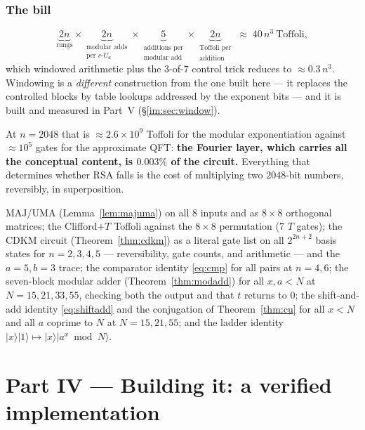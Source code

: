 \documentclass[11pt]{article}
\renewcommand{\ket}[1]{\lvert #1 \rangle}
\newcommand{\MAJ}{\mathrm{MAJ}}
\newcommand{\UMA}{\mathrm{UMA}}
\theoremstyle{plain}
\theoremstyle{remark}
\begin{document}
\section{The bill}

\[
\underbrace{2n}_{\text{rungs}}\times\underbrace{2n}_{\substack{\text{modular adds}\\ \text{per }c\text{-}U_a}}
\times\underbrace{5}_{\substack{\text{additions per}\\ \text{modular add}}}\times\underbrace{2n}_{\substack{\text{Toffoli per}\\ \text{addition}}}
\;\approx\;40\,n^3\ \text{Toffoli},
\]
which windowed arithmetic \cite{gidney-window} plus the $3$-of-$7$ control trick reduces to
$\approx0.3\,n^3$. Windowing is a \emph{different} construction from the one built here --- it
replaces the controlled blocks by table lookups addressed by the exponent bits --- and it is built
and measured in Part~V (\S\ref{im:sec:window}).

At $n=2048$ that is $\approx2.6\times10^9$ Toffoli for the modular exponentiation against
$\approx10^5$ gates for the approximate QFT: \textbf{the Fourier layer, which carries all the
conceptual content, is $0.003\%$ of the circuit.} Everything that determines whether RSA falls is
the cost of multiplying two $2048$-bit numbers, reversibly, in superposition.

\begin{keybox}[title={What was machine-checked}]
$\MAJ$/$\UMA$ (Lemma~\ref{lem:majuma}) on all $8$ inputs and as $8\times8$ orthogonal matrices;
the Clifford$+T$ Toffoli against the $8\times8$ permutation ($7$ $T$ gates);
the CDKM circuit (Theorem~\ref{thm:cdkm}) as a literal gate list on all $2^{2n+2}$ basis states for
$n=2,3,4,5$ --- reversibility, gate counts, and arithmetic --- and the $a=5,b=3$ trace;
the comparator identity \eqref{eq:cmp} for all pairs at $n=4,6$;
the seven-block modular adder (Theorem~\ref{thm:modadd}) for all $x,a<N$ at $N=15,21,33,55$,
checking both the output and that $t$ returns to $0$;
the shift-and-add identity \eqref{eq:shiftadd} and the conjugation of Theorem~\ref{thm:cu} for all
$x<N$ and all $a$ coprime to $N$ at $N=15,21,55$;
and the ladder identity $\ket x\ket1\mapsto\ket x\ket{a^x\bmod N}$.
\end{keybox}


\part*{Part IV --- Building it: a verified implementation}
\end{document}
